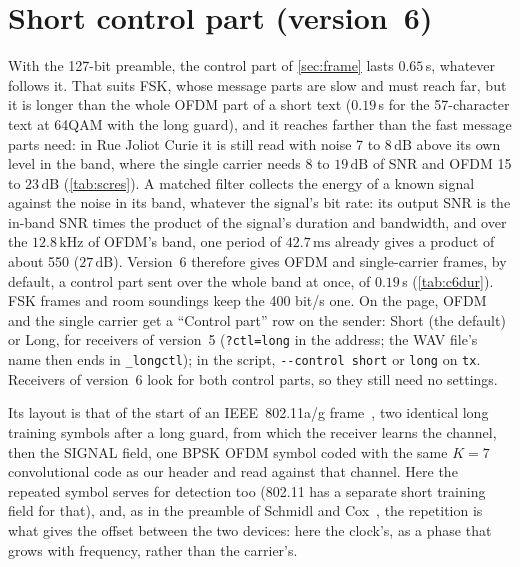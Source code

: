 \documentclass[11pt,a4paper]{article}
\newcommand{\kHz}{\,\mathrm{kHz}}
\newcommand{\ms}{\,\mathrm{ms}}
\newcommand{\dB}{\,\mathrm{dB}}
\newcommand{\code}[1]{\texttt{#1}}
\theoremstyle{remark}
\begin{document}
\section{Short control part (version~6)}
\label{sec:c6}
With the 127-bit preamble, the control part of \cref{sec:frame} lasts $0.65$\,s, whatever follows it. That suits FSK, whose message parts are slow and must reach far, but it is longer than the whole OFDM part of a short text ($0.19$\,s for the 57-character text at 64QAM with the long guard), and it reaches farther than the fast message parts need: in Rue Joliot Curie it is still read with noise 7 to $8\dB$ above its own level in the band, where the single carrier needs 8 to $19\dB$ of SNR and OFDM 15 to $23\dB$ (\cref{tab:scres}). A matched filter collects the energy of a known signal against the noise in its band, whatever the signal's bit rate: its output SNR is the in-band SNR times the product of the signal's duration and bandwidth, and over the $12.8\kHz$ of OFDM's band, one period of $42.7\ms$ already gives a product of about 550 ($27\dB$). Version~6 therefore gives OFDM and single-carrier frames, by default, a control part sent over the whole band at once, of $0.19$\,s (\cref{tab:c6dur}). FSK frames and room soundings keep the 400 bit/s one. On the page, OFDM and the single carrier get a ``Control part'' row on the sender: Short (the default) or Long, for receivers of version~5 (\code{?ctl=long} in the address; the WAV file's name then ends in \code{\_longctl}); in the script, \code{-{}-control short} or \code{long} on \code{tx}. Receivers of version~6 look for both control parts, so they still need no settings.

Its layout is that of the start of an IEEE~802.11a/g frame~\cite{ieee80211}, two identical long training symbols after a long guard, from which the receiver learns the channel, then the SIGNAL field, one BPSK OFDM symbol coded with the same $K = 7$ convolutional code as our header and read against that channel. Here the repeated symbol serves for detection too (802.11 has a separate short training field for that), and, as in the preamble of Schmidl and Cox~\cite{schmidl}, the repetition is what gives the offset between the two devices: here the clock's, as a phase that grows with frequency, rather than the carrier's.
\end{document}
